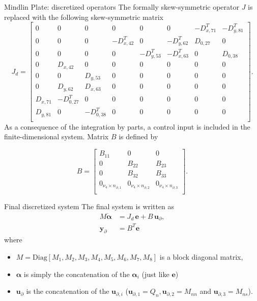 \documentclass{beamer}
\begin{document}
\begin{frame}{Mindlin Plate: discretized operators}
The formally skew-symmetric operator $J$ is replaced with the following skew-symmetric matrix
 \small
 \begin{equation*}
 J_d = 
 \begin{bmatrix}
 0 & 0 & 0 & 0 & 0 & 0 & -D_{x, 71}^T & -D_{y, 81}^T \\
 0 & 0 & 0 & -D_{x, 42}^T & 0 & -D_{y, 62}^T & D_{0, 27} & 0 \\
 0 & 0 & 0 & 0 & -D_{y, 53}^T & -D_{x, 63}^T & 0 & D_{0, 38} \\
 0 & D_{x, 42} & 0 & 0 & 0 & 0 & 0 & 0\\
 0 & 0 & D_{y, 53} & 0 & 0 & 0 & 0 & 0\\
 0 & D_{y, 62} & D_{x, 63} & 0 & 0 & 0 & 0 & 0\\
 D_{x, 71} & -D_{0, 27}^T & 0 & 0 & 0 & 0 & 0 & 0\\
 D_{y, 81} & 0 & -D_{0, 38}^T & 0 & 0 & 0 & 0 & 0\\
 \end{bmatrix}. 
 \end{equation*}
 As a consequence of the integration by parts, a control input is included in the finite-dimensional system. Matrix $B$ is defined by
 
 \begin{equation*}
 B = 
 \begin{bmatrix}
 B_{11} & 0 & 0 \\
 0 & B_{22} & B_{23} \\
 0 & B_{32} & B_{33} \\
 0_{\nu_4 \times n_{\partial, 1}} & 0_{ \nu_4 \times n_{\partial, 2}} & 0_{\nu_4 \times n_{\partial, 3}} \\
 \end{bmatrix}.
 \end{equation*}
\end{frame}

\begin{frame}{Final discretized system}
The final system is written as
\begin{equation*}
\begin{aligned}
M \dot{\bm{\alpha}} &= J_d  \,\bm{e} + B \, \bm{u}_{\partial}, \\
\bm{y}_{\partial} &= B^T \bm{e}
\end{aligned}   
\end{equation*}
where
\begin{itemize}
\item $M = \text{Diag}[M_1,M_2,M_3,M_4,M_5,M_6,M_7,M_8]$ is a block diagonal matrix, \\
\item $\bm{\alpha}$ is simply the concatenation of the $\bm\alpha_i$ (just like $\bm{e}$) \\
\item $\bm{u}_{\partial}$ is the concatenation of the $\bm{u}_{\partial, i}$ ($\bm{u}_{\partial, 1}= Q_n, \bm{u}_{\partial, 2}= M_{nn}$ and $\bm{u}_{\partial, 3}= M_{ns}$). 
\end{itemize}
   
\end{frame}
\end{document}

